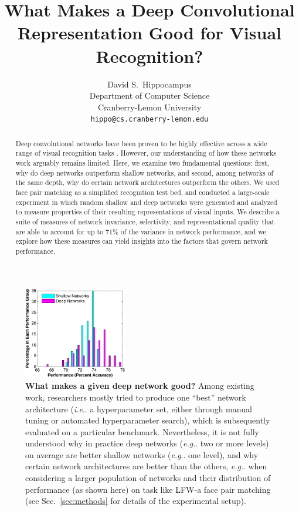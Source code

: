 \documentclass[fleqn]{article} %
\title{What Makes a Deep Convolutional Representation Good for Visual Recognition?} %
\author{
David S.~Hippocampus\\
Department of Computer Science\\
Cranberry-Lemon University\\
\texttt{hippo@cs.cranberry-lemon.edu} \\
}
\makeatletter
\DeclareRobustCommand\onedot{\futurelet\@let@token\@onedot}
\def\@onedot{\ifx\@let@token.\else.\null\fi\xspace}
\def\eg{\emph{e.g}\onedot} \def\Eg{\emph{E.g}\onedot}
\def\ie{\emph{i.e}\onedot} \def\Ie{\emph{I.e}\onedot}
\makeatother
\begin{document}
\maketitle

\begin{abstract}
Deep convolutional networks have been proven to be highly effective across a wide range of visual recognition tasks \cite{szegedy2014going, schroff2015facenet, donahue2014decaf}.
However, our understanding of how these networks work arguably remains limited.
Here, we examine two fundamental questions: first, why do deep networks outperform shallow networks, and second, among networks of the same depth, why do certain network architectures outperform the others.
We used face pair matching as a simplified recognition test bed, and conducted a large-scale experiment in which random shallow and deep networks were generated and analyzed to measure properties of their resulting representations of visual inputs.
We describe a suite of measures of network invariance, selectivity, and representational quality that are able to account for up to 71\% of the variance in network performance, and we explore how these measures can yield insights into the factors that govern network performance.  
\end{abstract}

\begin{figure} %
\centering \includegraphics[width=0.40\textwidth]{Figs/perf.pdf} %
\caption{{\bf What makes a given deep network good?}
Among existing work, researchers mostly tried to produce one ``best'' network architecture (\ie a hyperparameter set, either through manual tuning or automated hyperparameter search), which is subsequently evaluated on a particular benchmark.
Nevertheless, it is not fully understood why in practice deep networks (\eg two or more levels) on average are better shallow networks (\eg one level), and why certain network architectures are better than the others, \eg when considering a larger population of networks \cite{cox2011beyond} and their distribution of performance (as shown here) on task like LFW-a face pair matching \cite{wolf2011effective} (see Sec.~\ref{sec:methods} for details of the experimental setup). \vspace{-0.5ex}}
\label{fig:perf}
\end{figure}
\end{document}
